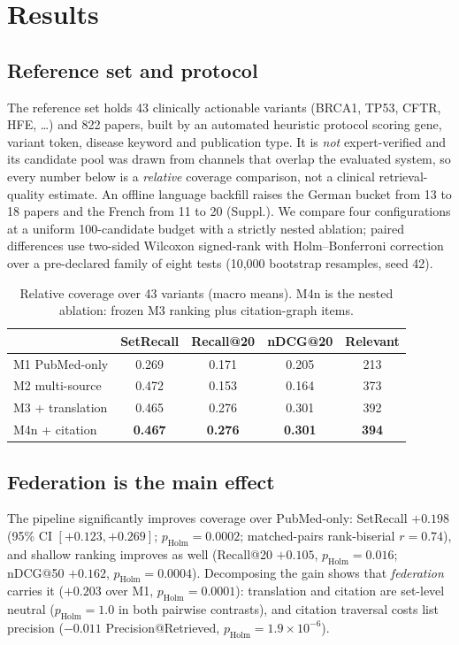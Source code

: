 \documentclass[10pt,twocolumn,letterpaper]{article}
\begin{document}
\section{Results}
\subsection*{Reference set and protocol}
The reference set holds 43 clinically actionable variants (BRCA1, TP53, CFTR,
HFE, \dots) and 822 papers, built by an automated heuristic protocol scoring
gene, variant token, disease keyword and publication type. It is \emph{not}
expert-verified and its candidate pool was drawn from channels that overlap the
evaluated system, so every number below is a \emph{relative} coverage
comparison, not a clinical retrieval-quality estimate. An offline language
backfill raises the German bucket from 13 to 18 papers and the French from 11 to
20 (Suppl.). We compare four configurations at a uniform 100-candidate budget
with a strictly nested ablation; paired differences use two-sided Wilcoxon
signed-rank with Holm--Bonferroni correction over a pre-declared family of eight
tests (10{,}000 bootstrap resamples, seed 42).

\begin{table}[t]
\centering
\footnotesize
\caption{Relative coverage over 43 variants (macro means). M4n is the nested
ablation: frozen M3 ranking plus citation-graph items.}
\label{tab:main}
\begin{tabular}{lcccc}
\toprule
 & SetRecall & Recall@20 & nDCG@20 & Relevant \\
\midrule
M1 PubMed-only        & 0.269 & 0.171 & 0.205 & 213 \\
M2 multi-source       & 0.472 & 0.153 & 0.164 & 373 \\
M3 + translation      & 0.465 & 0.276 & 0.301 & 392 \\
M4n + citation        & \textbf{0.467} & \textbf{0.276} & \textbf{0.301} & \textbf{394} \\
\bottomrule
\end{tabular}
\end{table}

\subsection*{Federation is the main effect}
The pipeline significantly improves coverage over PubMed-only:
SetRecall $+0.198$ (95\% CI $[+0.123,+0.269]$; $p_{\text{Holm}}=0.0002$;
matched-pairs rank-biserial $r=0.74$), and shallow ranking improves as well
(Recall@20 $+0.105$, $p_{\text{Holm}}=0.016$; nDCG@50 $+0.162$,
$p_{\text{Holm}}=0.0004$). Decomposing the gain shows that \emph{federation}
carries it ($+0.203$ over M1, $p_{\text{Holm}}=0.0001$): translation and
citation are set-level neutral ($p_{\text{Holm}}=1.0$ in both pairwise
contrasts), and citation traversal costs list precision
($-0.011$ Precision@Retrieved, $p_{\text{Holm}}=1.9\times10^{-6}$).
\end{document}
